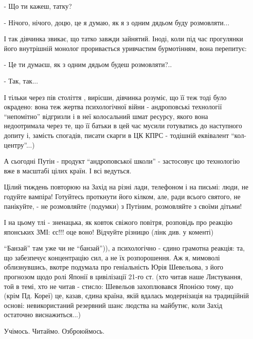 - Що ти кажеш, татку?

- Нічого, нічого, доцю, це я думаю, як я з одним дядьом буду розмовляти... 

І так дівчинка звикає, що татко завжди зайнятий. Іноді, коли під час прогулянки
його внутрішній монолог проривається уривчастим бурмотінням, вона перепитує:

- Це ти думаєш, як з одним дядьом будеш розмовляти?..

- Так, так...

І тільки через пів століття , вирісши, дівчинка розуміє, що її теж тоді було
окрадено: вона теж жертва психологічної війни - андроповські технології
\enquote{непомітно} відгризли і в неї колосальний шмат ресурсу, якого вона недоотримала
через те, що її батьки в цей час мусили готуватись до наступного допиту і,
замість спогадів, писати скарги в ЦК КПРС - тодішній еквівалент
\enquote{кол-центру}...)

А сьогодні Путін - продукт \enquote{андроповської школи} - застосовує цю технологію вже
в масштабі цілих країн. І всі ведуться. 

Цілий тиждень повторюю на Захід на різні лади, телефоном і на письмі: люди, не
годуйте вампіра! Готуйтесь проткнути його кілком, але, ради всього святого, не
панікуйте, - не розмовляйте (подумки) з Путіним, розмовляйте з своїми дітьми!

І на цьому тлі - зненацька, як ковток свіжого повітря, розповідь про реакцію
японських ЗМІ: єс!!! оце воно! Відчуйте різницю (лінк див. у коменті)

\enquote{Банзай} там уже чи не \enquote{банзай})), а психологічно - єдино грамотна реакція: та,
що забезпечує концентрацію сил, а не їх розпорошення. Аж я, мимоволі
облизнувшись, вкотре подумала про геніальність Юрія Шевельова, з його прогнозом
щодо ролі Японії в цивілізації 21-го ст. (хто читав наше Листування, той в
темі, хто не читав - стисло: Шевельов захоплювався Японією тому, що (крім Пд.
Кореї) це, казав, єдина країна, якій вдалась модернізація на традиційній
основі: невикористаний резервний шанс людства на майбутнє, коли Захід остаточно
виснажиться...)

Учімось. Читаймо. Озброюймось.
